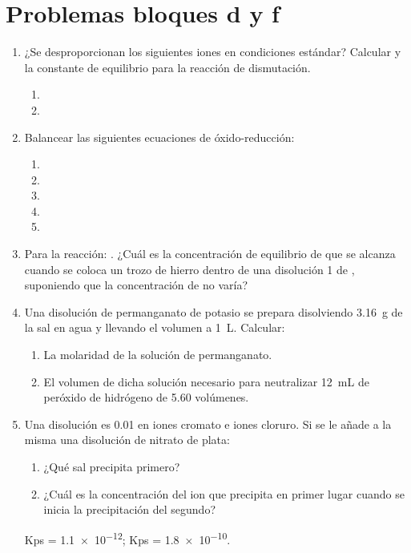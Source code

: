 \documentclass[10pt,a4paper]{book}
\begin{document}
\chapter{Problemas bloques d y f}
\begin{enumerate}
	
	\item  ¿Se desproporcionan los siguientes iones en condiciones estándar? Calcular  y la constante de equilibrio para la reacción de dismutación.
	\begin{enumerate}
		\item {}
		\item {}
	\end{enumerate}
	
	\item  Balancear las siguientes ecuaciones de óxido-reducción:
	\begin{enumerate}
		\item {}
		\item {}
		\item {}
		\item {}
		\item {}
	\end{enumerate}
	
	\item Para la reacción: . ¿Cuál es la concentración de equilibrio de 
	que se alcanza cuando se coloca un trozo de hierro dentro de una disolución \SI{1}{\Molar} de ,
	suponiendo que la concentración de  no varía?
	
	\item  Una disolución de permanganato de potasio se prepara disolviendo \SI{3,16}{\gram} de la sal en agua y
	llevando el volumen a \SI{1}{\liter}. Calcular:
	\begin{enumerate}
		\item  La molaridad de la solución de permanganato.
		\item El volumen de dicha solución necesario para neutralizar \SI{12}{\milli\liter} de peróxido de hidrógeno
		de \num{5,60} volúmenes.
	\end{enumerate}
	
	\item Una disolución es \SI{0,01}{\Molar} en iones cromato e iones cloruro. Si se le añade a la misma una
	disolución de nitrato de plata:
	\begin{enumerate}
		\item  ¿Qué sal precipita primero?
		\item ¿Cuál es la concentración del ion que precipita en primer lugar cuando se inicia la
		precipitación del segundo?
	\end{enumerate}
	Kps  = \num{1,1e-12}; Kps  = \num{1,8e-10}.
	

\end{enumerate}
\end{document}
